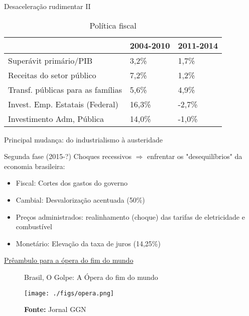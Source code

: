 \documentclass[presentation]{beamer}
\begin{document}
\begin{frame}[label={sec:org8ef045c}]{Desaceleração rudimentar II}
\begin{table}[htbp]
\caption{Política fiscal}
\centering
\begin{tabular}{lll}
\hline
 & 2004-2010 & 2011-2014\\
\hline
Superávit primário/PIB & 3,2\% & 1,7\%\\
Receitas do setor público & 7,2\% & 1,2\%\\
Transf. públicas para as famílias & 5,6\% & 4,9\%\\
Invest. Emp. Estatais (Federal) & 16,3\% & -2,7\%\\
Investimento Adm, Pública & 14,0\% & -1,0\%\\
\hline
\end{tabular}
\end{table}

\alert{Principal mudança:} do industrialismo à austeridade
\end{frame}

\begin{frame}[label={sec:org599ca6c}]{Segunda fase (2015-?)}
Choques recessivos \(\Rightarrow\) enfrentar os "desequilíbrios" da economia brasileira:

\begin{itemize}
\item \alert{Fiscal:} Cortes dos gastos do governo
\item \alert{Cambial:} Desvalorização acentuada (50\%)
\item \alert{Preços administrados:} realinhamento (choque) das tarifas de eletricidade e combustível
\item \alert{Monetário:} Elevação da taxa de juros (14,25\%)
\end{itemize}
\end{frame}

\begin{frame}[label={sec:org8366b0b}]{\href{https://www.causaoperaria.org.br/brasil-o-golpe-a-opera-do-fim-do-mundo-artista-retrata-o-golpe-de-estado-no-pais/}{Prêambulo para a ópera do fim do mundo}}
\begin{figure}[htb]
\centering
\caption{Brasil, O Golpe: A Ópera do fim do mundo} 
\texttt{[image: ./figs/opera.png]}
\caption*{\textbf{Fonte:} Jornal GGN}
\end{figure}
\end{frame}
\end{document}
